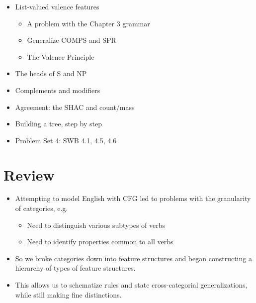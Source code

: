 \documentclass[a4paper,landscape,headrule,footrule]{foils}
\begin{document}
\maketitle


\begin{itemize}
\item List-valued valence features
  \begin{itemize}
  \item A problem with the Chapter 3 grammar
  \item Generalize COMPS and SPR
  \item The Valence Principle
  \end{itemize}
\item The heads of S and NP
\item Complements and modifiers
\item Agreement: the SHAC and count/mass
\item Building a tree, step by step
\item Problem Set 4: SWB 4.1, 4.5, 4.6
\end{itemize}

\section{Review}


\begin{itemize}
\item Attempting to model English with CFG led to problems
  with the granularity of categories, e.g.
  \begin{itemize}
  \item Need to distinguish various subtypes of verbs
  \item Need to identify properties common to all verbs
  \end{itemize}
\item So we broke categories down into feature structures and
  began constructing a hierarchy of types of feature
  structures.
\item This allows us to schematize rules and state cross-categorial
  generalizations, while still making fine distinctions.
\end{itemize}
\end{document}
